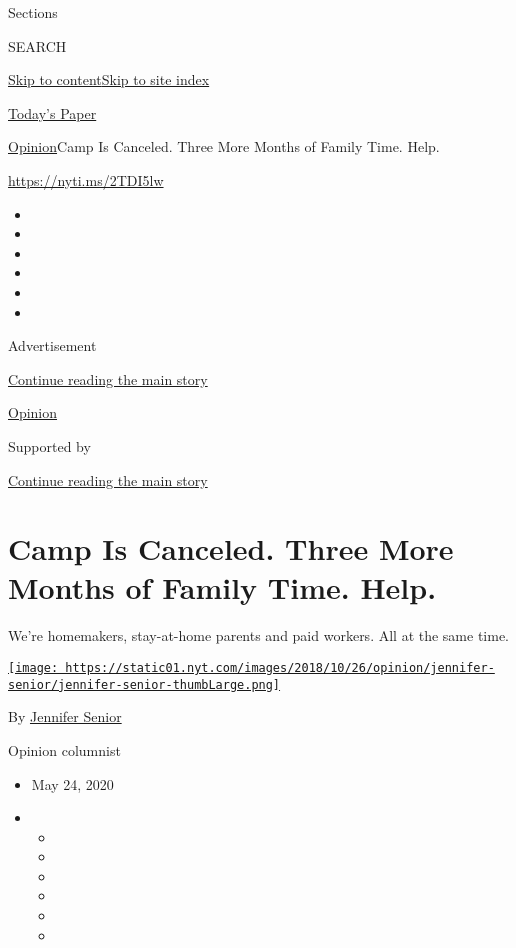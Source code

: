 Sections

SEARCH

\protect\hyperlink{site-content}{Skip to
content}\protect\hyperlink{site-index}{Skip to site index}

\href{https://myaccount.nytimes.com/auth/login?response_type=cookie\&client_id=vi}{}

\href{https://www.nytimes.com/section/todayspaper}{Today's Paper}

\href{/section/opinion}{Opinion}\textbar{}Camp Is Canceled. Three More
Months of Family Time. Help.

\href{https://nyti.ms/2TDI5lw}{https://nyti.ms/2TDI5lw}

\begin{itemize}
\item
\item
\item
\item
\item
\item
\end{itemize}

Advertisement

\protect\hyperlink{after-top}{Continue reading the main story}

\href{/section/opinion}{Opinion}

Supported by

\protect\hyperlink{after-sponsor}{Continue reading the main story}

\hypertarget{camp-is-canceled-three-more-months-of-family-time-help}{%
\section{Camp Is Canceled. Three More Months of Family Time.
Help.}\label{camp-is-canceled-three-more-months-of-family-time-help}}

We're homemakers, stay-at-home parents and paid workers. All at the same
time.

\href{https://www.nytimes.com/by/jennifer-senior}{\texttt{[image: https://static01.nyt.com/images/2018/10/26/opinion/jennifer-senior/jennifer-senior-thumbLarge.png]}}

By \href{https://www.nytimes.com/by/jennifer-senior}{Jennifer Senior}

Opinion columnist

\begin{itemize}
\item
  May 24, 2020
\item
  \begin{itemize}
  \item
  \item
  \item
  \item
  \item
  \item
  \end{itemize}
\end{itemize}

